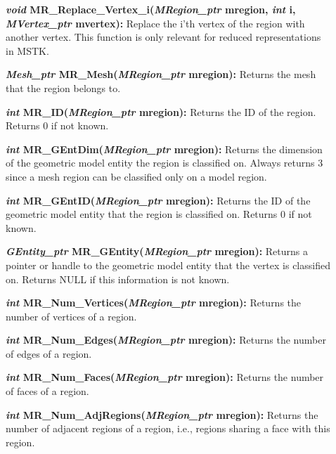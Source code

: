 \documentclass[12pt]{article}
\begin{document}
\begin{description}
\item[]\textbf{\textit{void}
    MR\_Replace\_Vertex\_i(\textit{MRegion\_ptr} mregion, \textit{int}
    i, \textit{MVertex\_ptr} mvertex):} Replace the i'th vertex of the
  region with another vertex. This function is only relevant for
  reduced representations in MSTK.

\item[]

  
\item[]\textbf{\textit{Mesh\_ptr} MR\_Mesh(\textit{MRegion\_ptr}
    mregion):} Returns the mesh that the region belongs to.
  
\item[]\textbf{\textit{int} MR\_ID(\textit{MRegion\_ptr} mregion):}
  Returns the ID of the region. Returns 0 if not known.
  
\item[]\textbf{\textit{int} MR\_GEntDim(\textit{MRegion\_ptr}
    mregion):} Returns the dimension of the geometric model entity the
  region is classified on. Always returns 3 since a mesh region can be
  classified only on a model region.
  
\item[]\textbf{\textit{int} MR\_GEntID(\textit{MRegion\_ptr}
    mregion):} Returns the ID of the geometric model entity that the
  region is classified on. Returns 0 if not known.
  
\item[]\textbf{\textit{GEntity\_ptr} MR\_GEntity(\textit{MRegion\_ptr}
    mregion):} Returns a pointer or handle to the geometric model
  entity that the vertex is classified on. Returns NULL if this
  information is not known.

\item[]

\item[]\textbf{\textit{int} MR\_Num\_Vertices(\textit{MRegion\_ptr}
mregion):} Returns the number of vertices of a region.

\item[]\textbf{\textit{int} MR\_Num\_Edges(\textit{MRegion\_ptr} mregion):}
Returns the number of edges of a region.

\item[]\textbf{\textit{int} MR\_Num\_Faces(\textit{MRegion\_ptr} mregion):}
Returns the number of faces of a region.

\item[]\textbf{\textit{int} MR\_Num\_AdjRegions(\textit{MRegion\_ptr}
mregion):} Returns the number of adjacent regions of a region, i.e.,
regions sharing a face with this region.


\end{description}
\end{document}
